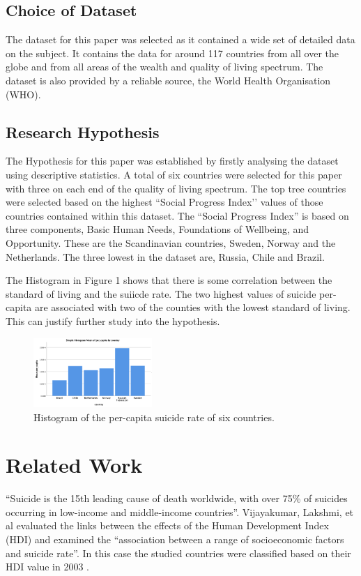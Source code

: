 \documentclass[conference]{IEEEtran}
\begin{document}
\subsection{Choice of Dataset}
The dataset for this paper was selected as it contained a wide set of detailed data on the subject.
It contains the data for around 117 countries from all over the globe and from all areas of the wealth and quality of living spectrum.
The dataset is also provided by a reliable source, the World Health Organisation (WHO).

\subsection{Research Hypothesis}
The Hypothesis for this paper was established by firstly analysing the dataset using descriptive statistics.
A total of six countries were selected for this paper with three on each end of the quality of living spectrum.
The top tree countries were selected based on the highest ``Social Progress Index’’ values of those countries contained within this dataset.
The ``Social Progress Index'' is based on three components, Basic Human Needs, Foundations of Wellbeing, and Opportunity\cite{high_standard_living}.
These are the Scandinavian countries, Sweden, Norway and the Netherlands.
The three lowest in the dataset are, Russia, Chile and Brazil.

The Histogram in Figure 1 shows that there is some correlation between the standard of living and the suiicde rate.
The two highest values of suicide per-capita are associated with two of the counties with the lowest standard of living.
This can justify further study into the hypothesis.
\newline
    \begin{figure}[ht]
        \centering
        \includegraphics[width=0.4\textwidth]{percapita_bar}
        \caption{Histogram of the per-capita suicide rate of six countries.}
    \end{figure}

\section{Related Work}
``Suicide is the 15th leading cause of death worldwide, with over 75\% of suicides occurring in low-income and middle-income countries''\cite{sui_low_income}.
Vijayakumar, Lakshmi, et al evaluated the links between the effects of the Human Development Index (HDI) and examined the
``association between a range of socioeconomic factors and suicide rate''.
In this case the studied countries were classified based on their HDI value in 2003 \cite{Sui_in_developing}.
\end{document}
